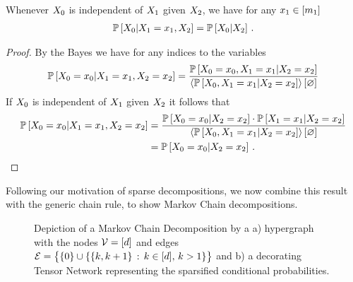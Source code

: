 \begin{theorem}
    \label{the:conditionDropping}
    Whenever $X_{0}$ is independent of $X_{1}$ given $X_{2}$, we have for any $x_{1}\in[m_{1}]$
    \begin{align*}
        \mathbb{P}\left[X_{0}|X_{1}=x_{1},X_{2}\right]
        = \mathbb{P}\left[X_{0}|X_{2}\right] \, .
    \end{align*}
\end{theorem}
\begin{proof}
    By the Bayes  we have for any indices to the variables
    \begin{align*}
        \mathbb{P}\left[X_{0}=x_{0}|X_{1}=x_{1},X_{2}=x_{2}\right]
        = \frac{\mathbb{P}\left[X_{0}=x_{0},X_{1}=x_{1}|X_{2}=x_{2}\right]}{
            \left\langle \mathbb{P}\left[X_{0},X_{1}=x_{1}|X_{2}=x_{2}\right]\right\rangle \left[ \varnothing \right]
        }
    \end{align*}
    If $X_{0}$ is independent of $X_{1}$ given $X_{2}$ it follows that
    \begin{align*}
        \mathbb{P}\left[X_{0}=x_{0}|X_{1}=x_{1},X_{2}=x_{2}\right]
        & = \frac{\mathbb{P}\left[X_{0}=x_{0}|X_{2}=x_{2}\right] \cdot \mathbb{P}\left[X_{1}=x_{1}|X_{2}=x_{2}\right]}{
            \left\langle \mathbb{P}\left[X_{0},X_{1}=x_{1}|X_{2}=x_{2}\right]\right\rangle \left[ \varnothing \right]
        } \\
        & = \mathbb{P}\left[X_{0}=x_{0}|X_{2}=x_{2}\right] \, .
    \end{align*}
\end{proof}

Following our motivation of sparse decompositions, we now combine this result with the generic chain rule, to show Markov Chain decompositions.
\begin{figure}[h]
    \begin{center}
        
    \end{center}
    \caption{Depiction of a Markov Chain Decomposition by a
    a) hypergraph with the nodes $\mathcal{V}=[d]$ and edges $\mathcal{E}=\big\{\{0\}\cup\{\{k,k+1\} \, : \, k\in[d], \, k>1\} \big\}$ and
    b) a decorating Tensor Network representing the sparsified conditional probabilities.}
    \label{fig:MC}
\end{figure}

